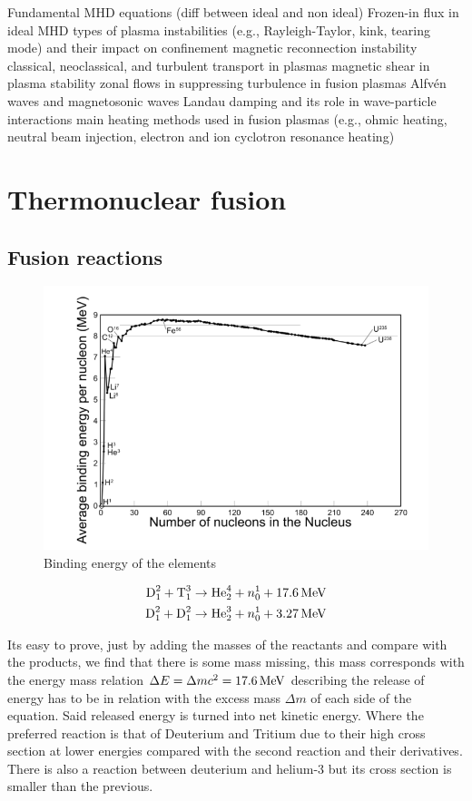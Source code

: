 \documentclass[smallextended]{svjour3}
\begin{document}
Fundamental MHD equations (diff between ideal and non ideal)
Frozen-in flux in ideal MHD
types of plasma instabilities (e.g., Rayleigh-Taylor, kink, tearing mode) and their impact on confinement
magnetic reconnection instability
classical, neoclassical, and turbulent transport in plasmas
magnetic shear in plasma stability
 zonal flows in suppressing turbulence in fusion plasmas
 Alfvén waves and magnetosonic waves
 Landau damping and its role in wave-particle interactions
 main heating methods used in fusion plasmas (e.g., ohmic heating, neutral beam injection, electron and ion cyclotron resonance heating)
\newpage
\section{Thermonuclear fusion}

\subsection{Fusion reactions}

\begin{figure}
    \centering
    \includegraphics[width=0.8\linewidth]{images/BindingEnergyOfElements.png}
    \caption{Binding energy of the elements}
    \label{BindingEnergy}
\end{figure}

\begin{align}
\text{D}_1^2 +  \text{T}_1^3 &\to  \text{He}_2^4 + n_0^1 + 17.6 \, \rm{MeV} \\
\text{D}_1^2 +  \text{D}_1^2 &\to  \text{He}_2^3 + n_0^1 + 3.27 \, \rm{MeV}
\label{fusionreactions}
\end{align}

Its easy to prove, just by adding the masses of the reactants and compare with the products, we find that there is some mass missing, this mass corresponds with the energy mass relation $\Delta E = \Delta m c^2 = 17.6 \, \rm{MeV}$ describing the release of energy has to be in relation with the excess mass $\Delta m$ of each side of the equation. Said released energy is turned into net kinetic energy. Where the preferred reaction is that of Deuterium and Tritium due to their high cross section at lower energies compared with the second reaction and their derivatives. There is also a reaction between deuterium and helium-3 but its cross section is smaller than the previous.
\end{document}
